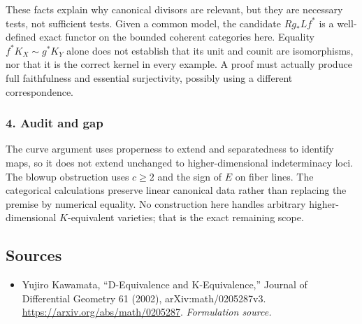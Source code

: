 \documentclass[11pt]{article}
\begin{document}
These facts explain why canonical divisors are relevant, but they are necessary tests, not sufficient tests. Given a common model, the candidate $Rg_*Lf^*$ is a well-defined exact functor on the bounded coherent categories here. Equality $f^*K_X\sim g^*K_Y$ alone does not establish that its unit and counit are isomorphisms, nor that it is the correct kernel in every example. A proof must actually produce full faithfulness and essential surjectivity, possibly using a different correspondence.

\subsubsection{4. Audit and gap}
The curve argument uses properness to extend and separatedness to identify maps, so it does not extend unchanged to higher-dimensional indeterminacy loci. The blowup obstruction uses $c\ge2$ and the sign of $E$ on fiber lines. The categorical calculations preserve linear canonical data rather than replacing the premise by numerical equality. No construction here handles arbitrary higher-dimensional $K$-equivalent varieties; that is the exact remaining scope.

\subsection{Sources}
\begin{itemize}
\item[S1]Yujiro Kawamata, “D-Equivalence and K-Equivalence,” Journal of Differential Geometry 61 (2002), arXiv:math/0205287v3.
\url{https://arxiv.org/abs/math/0205287}.
\textit{Formulation source.}
\end{itemize}
\end{document}
